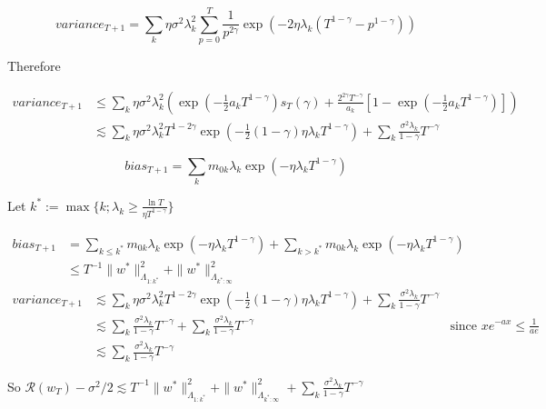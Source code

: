 \documentclass{article}
\begin{document}
\[
variance_{T+1} = \sum_k \eta \sigma^2 \lambda_k^2 \sum_{p=0}^T \frac{1}{p^{2\gamma}} \exp\left(-2\eta \lambda_k(T^{1-\gamma} - p^{1-\gamma})\right)  
\]

Therefore

\begin{align*}
 variance_{T+1} &\leq \sum_k \eta \sigma^2 \lambda_k^2 \left(  \exp\left(-\frac{1}{2}a_kT^{1-\gamma} \right) s_T(\gamma)+\frac{2^{2\gamma}T^{-\gamma}}{ a_k}\left[ 1-\exp\left(-\frac{1}{2}a_kT^{1-\gamma}\right)  \right]\right)\\
& \lesssim \sum_k \eta \sigma^2\lambda_k^2 T^{1-2\gamma}\exp\left(-\frac{1}{2}(1-\gamma)\eta\lambda_k T^{1-\gamma}\right) + \sum_k  \frac{\sigma^2\lambda_k}{1-\gamma }  T^{-\gamma}
\end{align*}

\[
bias_{T+1} = \sum_k m_{0k}\lambda_k \exp(-\eta \lambda_k T^{1-\gamma}) 
\]


Let $k^* := \max\{k;\lambda_k \geq \frac{\ln T}{\eta T^{1-\gamma}}\}$

\begin{align*}
bias_{T+1} &= \sum_{k\leq k^*} m_{0k}\lambda_k \exp(-\eta \lambda_k T^{1-\gamma}) + \sum_{k > k^*} m_{0k}\lambda_k \exp(-\eta \lambda_k T^{1-\gamma})\\
&\leq T^{-1}\|w^*\|^2_{\Lambda_{1:k^*}} + \|w^*\|^2_{\Lambda_{k^*:\infty}}
\end{align*}
\begin{align*}
variance_{T+1} &\lesssim \sum_k \eta \sigma^2\lambda_k^2 T^{1-2\gamma}\exp\left(-\frac{1}{2}(1-\gamma)\eta\lambda_k T^{1-\gamma}\right) + \sum_k  \frac{\sigma^2\lambda_k}{1-\gamma }  T^{-\gamma}\\
&\lesssim \sum_k \frac{\sigma^2 \lambda_k}{1-\gamma} T^{-\gamma} + \sum_k  \frac{\sigma^2\lambda_k}{1-\gamma }  T^{-\gamma} & \text{since } xe^{-ax} \leq \frac{1}{ae}\\
&\lesssim  \sum_k \frac{\sigma^2 \lambda_k}{1-\gamma} T^{-\gamma} 
\end{align*}

So $\mathcal R(w_T) - \sigma^2/2 \lesssim T^{-1}\|w^*\|^2_{\Lambda_{1:k^*}} + \|w^*\|^2_{\Lambda_{k^*:\infty}} + \sum_k \frac{\sigma^2 \lambda_k}{1-\gamma} T^{-\gamma} $

\end{document}
